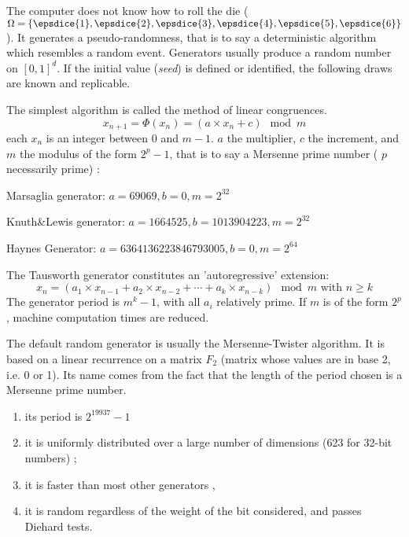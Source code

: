 \begin{f}
The computer does not know how to roll the die ($\Omega=\{ \epsdice{1}, \epsdice{2}, \epsdice{3}, \epsdice{4}, \epsdice{5}, \epsdice{6} \}$).
It generates a pseudo-randomness, that is to say a deterministic algorithm which resembles a random event.
Generators usually produce a random number on $[0,1]^d$.
If the initial value (\emph{seed}) is defined or identified, the following draws are known and replicable.


The simplest algorithm is called the method of linear congruences.
$$
x_{n+1}=\Phi(x_n)= (a\times x_n+c) \mod m
$$ \small
each $x_n$ is an integer between 0 and $m-1$.
$a$ the multiplier, $c$ the increment, and $m$ the modulus of the form $2^p-1$, that is to say a Mersenne prime number ( $ p $ necessarily prime) :

Marsaglia generator: $a=69069, b=0, m=2^{32}$

Knuth\&Lewis generator: $a=1664525, b=1013904223, m=2^{32}$

Haynes Generator: $a=6364136223846793005, b=0, m=2^{64}$

The Tausworth generator constitutes an 'autoregressive' extension:
$$
x_{n}=(a_{1}\times x_{n-1}+a_{2}\times x_{n-2}+\cdots +a_{k}\times x_{n-k}) \mod m \text{ with } n\geq k
$$
The generator period is $m^k-1$, with all $a_i$ relatively prime. If $m$ is of the form $2^p$ , machine computation times are reduced.


The default random generator is usually the Mersenne-Twister algorithm. It is based on a linear recurrence on a matrix $F_{2}$ (matrix whose values are in base 2, i.e. 0 or 1). 
Its name comes from the fact that the length of the period chosen is a Mersenne prime number.
\begin{enumerate}
	\item     its period is $2^{19937}-1 $
	\item     it is uniformly distributed over a large number of dimensions (623 for 32-bit numbers) ;
	\item     it is faster than most other generators ,
	\item     it is random regardless of the weight of the bit considered, and passes Diehard tests.
\end{enumerate}
\end{f}
%


